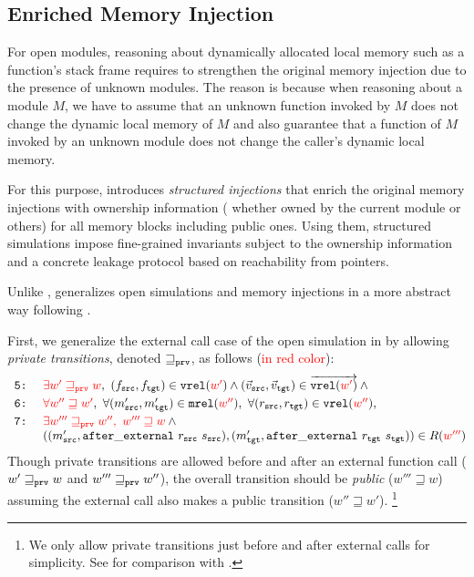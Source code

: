 {\subsection{Enriched Memory Injection}
\label{sec:overview-verification:injection:dynamic}
%
For open modules, reasoning about dynamically allocated local memory
such as a function's stack frame requires to strengthen the original
memory injection due to the presence of unknown modules.  The reason
is because when reasoning about a module $M$, we have to assume that
an unknown function invoked by $M$ does not change the dynamic local
memory of $M$ and also guarantee that a function of $M$ invoked by an
unknown module does not change the caller's dynamic local memory.

For this purpose, \ccc{} introduces \emph{structured injections} that
enrich the original memory injections with ownership information (\ie
whether owned by the current module or others) for all memory blocks
including public ones.  Using them, structured simulations impose
fine-grained invariants subject to the ownership information and a
concrete leakage protocol based on reachability from pointers.

Unlike \ccc{}, \ccm{} generalizes open simulations and memory injections
in a more abstract way following \cite{DBLP:conf/icfp/DreyerNB10,pb}.

First, we generalize the external call case of the open simulation in 
by allowing \emph{private transitions}, denoted $\sqsupseteq_{\texttt{prv}}$,
as follows (\textcolor{red}{in red color}):
\[
\begin{array}{@{}l@{}}
\texttt{ 5:}~\quad \textcolor{red}{\exists w' \sqsupseteq_\weak w},~ (f_\src,f_\tgt)\in \texttt{vrel}(\textcolor{red}{w'}) \land (\vec{v}_\src,\vec{v}_\tgt) \in \overrightarrow{\texttt{vrel}(\textcolor{red}{w'})} \land{} \\[1mm]
\texttt{ 6:}~\quad \textcolor{red}{\forall w'' \sqsupseteq w'},~\forall (\memsrc',\memtgt')\in\texttt{mrel}(\textcolor{red}{w''}),~ \forall (r_\src,r_\tgt)\in \texttt{vrel}(\textcolor{red}{w''}),\\[1mm]
\texttt{ 7:}~\quad \textcolor{red}{\exists w''' \sqsupseteq_\weak w'',~ w''' \sqsupseteq w} \land {} \\
\phantom{\texttt{ 7:}}~\quad ((\memsrc',\mathtt{after\_external}~r_\src~\stsrc),(\memtgt',\mathtt{after\_external}~r_\tgt~\sttgt))\in R(\textcolor{red}{w'''})
\end{array}
\]
Though private transitions are allowed before and after an external function call (\ie
$w' \sqsupseteq_{\texttt{prv}} w$ and $w''' \sqsupseteq_{\texttt{prv}} w''$),
the overall transition should be \emph{public} (\ie $w''' \sqsupseteq w$)
assuming the external call also makes a public transition (\ie $w'' \sqsupseteq w'$).%
\footnote{We only allow private transitions just before and after external calls for simplicity.
See  for comparison with \cite{DBLP:conf/icfp/DreyerNB10,pb}.}

}

